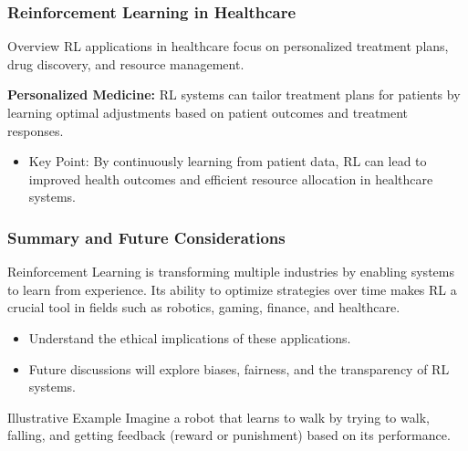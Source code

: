 \documentclass{beamer}
\begin{document}
\begin{frame}[fragile]
    \frametitle{Reinforcement Learning in Healthcare}
    \begin{block}{Overview}
        RL applications in healthcare focus on personalized treatment plans, drug discovery, and resource management.
    \end{block}
    
    \begin{example}
        \textbf{Personalized Medicine:} RL systems can tailor treatment plans for patients by learning optimal adjustments based on patient outcomes and treatment responses.
    \end{example}
    
    \begin{itemize}
        \item Key Point: By continuously learning from patient data, RL can lead to improved health outcomes and efficient resource allocation in healthcare systems.
    \end{itemize}
\end{frame}

\begin{frame}[fragile]
    \frametitle{Summary and Future Considerations}
    Reinforcement Learning is transforming multiple industries by enabling systems to learn from experience. Its ability to optimize strategies over time makes RL a crucial tool in fields such as robotics, gaming, finance, and healthcare.

    \begin{itemize}
        \item Understand the ethical implications of these applications.
        \item Future discussions will explore biases, fairness, and the transparency of RL systems.
    \end{itemize}

    \begin{block}{Illustrative Example}
        Imagine a robot that learns to walk by trying to walk, falling, and getting feedback (reward or punishment) based on its performance.
    \end{block}
\end{frame}
\end{document}
